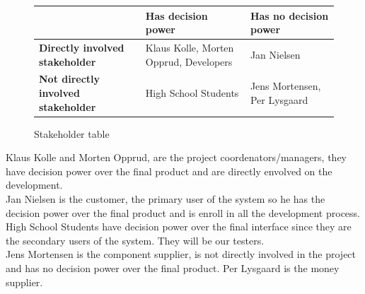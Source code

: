 \begin{figure}[h!]
 \begin{centering}
  \begin{tabular}{| l | l | l |}
   \hline
      & \textbf{Has decision power} & \textbf{Has no decision power} \\ \hline
    \textbf{Directly involved stakeholder} & Klaus Kolle,
    Morten Opprud, Developers &  Jan Nielsen \\ \hline \textbf{Not directly
    involved stakeholder} & High School Students & Jens Mortensen, Per Lysgaard \\
    \hline
   \end{tabular}
  \end{centering}
 \caption{Stakeholder table}
\end{figure}
Klaus Kolle and Morten Opprud, are the project coordenators/managers, they
have decision power over the final product and are directly envolved on the
development.\\
\newline
Jan Nielsen is the customer, the primary user of the system so he has the
decision power over the final product and is enroll in all the development
process.\\
\newline
High School Students have decision power over the final interface since they
are the secondary users of the system. They will be our testers.\\
\newline
Jens Mortensen is the component supplier, is not directly involved in the
project and has no decision power over the final product.
\newline
Per Lysgaard is the money supplier.
\newline
\newpage

